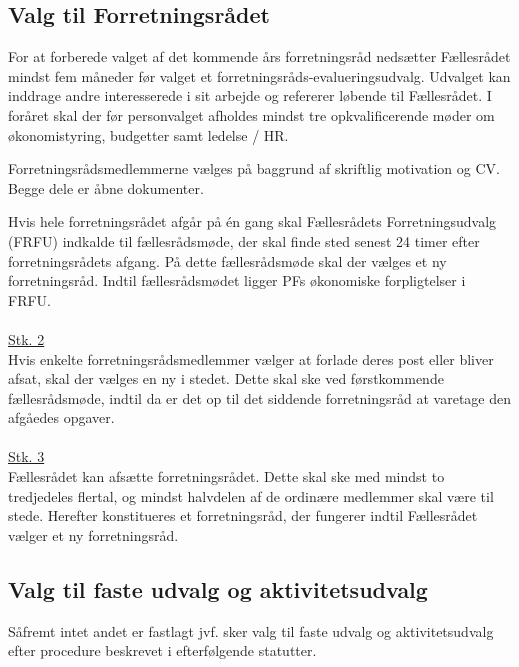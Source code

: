 \begin{list}
\subsection{Valg til Forretningsrådet} \label{S:kap:ValgForretningsraadet}
\item For at forberede valget af det kommende års forretningsråd nedsætter Fællesrådet mindst fem måneder før valget et forretningsråds-evalueringsudvalg. Udvalget kan inddrage andre interesserede i sit arbejde og refererer løbende til Fællesrådet. I foråret skal der før personvalget afholdes mindst tre opkvalificerende møder om økonomistyring, budgetter samt ledelse / HR.
\item Forretningsrådsmedlemmerne vælges på baggrund af skriftlig motivation og CV. Begge dele er åbne dokumenter.
\item Hvis hele forretningsrådet afgår på én gang skal Fællesrådets Forretningsudvalg (FRFU) indkalde til fællesrådsmøde, der skal finde sted senest 24 timer efter forretningsrådets afgang. På dette fællesrådsmøde skal der vælges et ny forretningsråd. Indtil fællesrådsmødet ligger PFs økonomiske forpligtelser i FRFU.\\
\\
\underline{Stk. 2}\\
Hvis enkelte forretningsrådsmedlemmer vælger at forlade deres post eller bliver afsat, skal der vælges en ny i stedet. Dette skal ske ved førstkommende fællesrådsmøde, indtil da er det op til det siddende forretningsråd at varetage den afgåedes opgaver.\\
\\
\underline{Stk. 3}\\
Fællesrådet kan afsætte forretningsrådet. Dette skal ske med mindst to tredjedeles flertal, og mindst halvdelen af de ordinære medlemmer skal være til stede. Herefter konstitueres et forretningsråd, der fungerer indtil Fællesrådet vælger et ny forretningsråd.


\subsection{Valg til faste udvalg og aktivitetsudvalg} \label{kap:ValgTilUdvalg}
\item Såfremt intet andet er fastlagt jvf.  sker valg til faste udvalg og aktivitetsudvalg efter procedure beskrevet i efterfølgende statutter.\\


\end{list}
